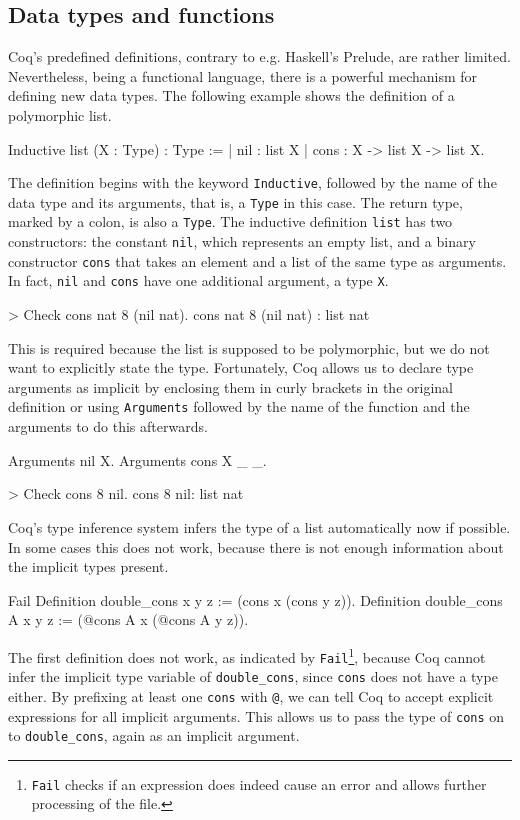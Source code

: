 \documentclass[paper = a4, fleqn, twoside]{scrreprt}
\newcommand{\coqinline}[1]{\texttt{#1}}
\begin{document}
\subsection{Data types and functions}
Coq's predefined definitions, contrary to e.g. Haskell's Prelude, are rather limited. Nevertheless, being a functional language, there is a powerful mechanism for defining new data types. The following example shows the definition of a polymorphic list.
\begin{coqcode}
Inductive list (X : Type) : Type :=
  | nil  : list X
  | cons : X -> list X -> list X.
\end{coqcode}
The definition begins with the keyword \coqinline{Inductive}, followed by the name of the data type and its arguments, that is, a \coqinline{Type} in this case. The return type, marked by a colon, is also a \coqinline{Type}. The inductive definition \coqinline{list} has two constructors: the constant \coqinline{nil}, which represents an empty list, and a binary constructor \coqinline{cons} that takes an element and a list of the same type as arguments. In fact, \coqinline{nil} and \coqinline{cons} have one additional argument, a type \coqinline{X}. 
\begin{coqcode}
> Check cons nat 8 (nil nat).
cons nat 8 (nil nat) : list nat
\end{coqcode}
This is required because the list is supposed to be polymorphic, but we do not want to explicitly state the type. Fortunately, Coq allows us to declare type arguments as implicit by enclosing them in curly brackets in the original definition or using \coqinline{Arguments} followed by the name of the function and the arguments to do this afterwards.
\begin{coqcode}
Arguments nil {X}.
Arguments cons {X} _ _.

> Check cons 8 nil.
cons 8 nil: list nat
\end{coqcode}
Coq's type inference system infers the type of a list automatically now if possible. In some cases this does not work, because there is not enough information about the implicit types present. 
\begin{coqcode}
Fail Definition double_cons x y z := (cons x (cons y z)).
Definition double_cons {A} x y z := (@cons A x (@cons A y z)).
\end{coqcode}
The first definition does not work, as indicated by \coqinline{Fail}\footnote{\coqinline{Fail} checks if an expression does indeed cause an error and allows further processing of the file.}, because Coq cannot infer the implicit type variable of \coqinline{double_cons}, since \coqinline{cons} does not have a type either. By prefixing at least one \coqinline{cons} with \coqinline{@}, we can tell Coq to accept explicit expressions for all implicit arguments. This allows us to pass the type of \coqinline{cons} on to \coqinline{double_cons}, again as an implicit argument.
\end{document}
